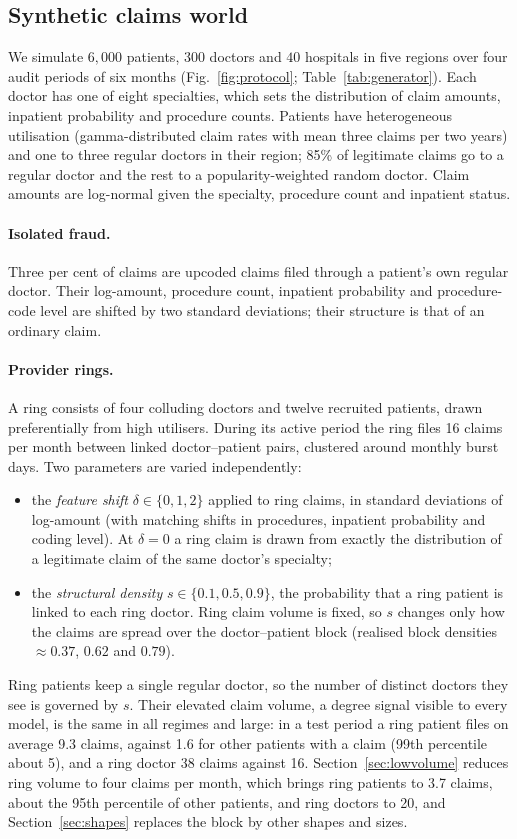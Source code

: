 \documentclass[pdflatex,sn-vancouver-num]{sn-jnl}
\begin{document}
\subsection{Synthetic claims world}\label{sec:generator}
We simulate $6{,}000$ patients, $300$ doctors and $40$ hospitals in five
regions over four audit periods of six months (Fig.~\ref{fig:protocol}; Table~\ref{tab:generator}).
Each doctor has one of eight specialties, which sets the distribution of
claim amounts, inpatient probability and procedure counts. Patients have
heterogeneous utilisation (gamma-distributed claim rates with mean three
claims per two years) and one to three regular doctors in their region;
85\% of legitimate claims go to a regular doctor and the rest to a
popularity-weighted random doctor. Claim amounts are log-normal given the
specialty, procedure count and inpatient status.

\paragraph{Isolated fraud.} Three per cent of claims are upcoded claims filed
through a patient's own regular doctor. Their log-amount, procedure count,
inpatient probability and procedure-code level are shifted by two standard
deviations; their structure is that of an ordinary claim.

\paragraph{Provider rings.} A ring consists of four colluding doctors and
twelve recruited patients, drawn preferentially from high utilisers. During
its active period the ring files 16 claims per month between linked
doctor--patient pairs, clustered around monthly burst days. Two parameters
are varied independently:
\begin{itemize}
\item the \emph{feature shift} $\delta\in\{0, 1, 2\}$ applied to ring
  claims, in standard deviations of log-amount (with matching shifts in
  procedures, inpatient probability and coding level). At $\delta=0$ a ring
  claim is drawn from exactly the distribution of a legitimate claim of the
  same doctor's specialty;
\item the \emph{structural density} $s\in\{0.1, 0.5, 0.9\}$, the probability
  that a ring patient is linked to each ring doctor. Ring claim volume is
  fixed, so $s$ changes only how the claims are spread over the
  doctor--patient block (realised block densities $\approx 0.37$, $0.62$ and
  $0.79$).
\end{itemize}
Ring patients keep a single regular doctor, so the number of distinct
doctors they see is governed by $s$. Their elevated claim volume, a degree
signal visible to every model, is the same in all regimes and large: in a
test period a ring patient files on average 9.3 claims, against 1.6 for
other patients with a claim (99th percentile about 5), and a ring doctor 38
claims against 16. Section~\ref{sec:lowvolume} reduces ring volume to four
claims per month, which brings ring patients to 3.7 claims, about the 95th
percentile of other patients, and ring doctors to 20, and
Section~\ref{sec:shapes} replaces the block by other shapes and sizes.
\end{document}

